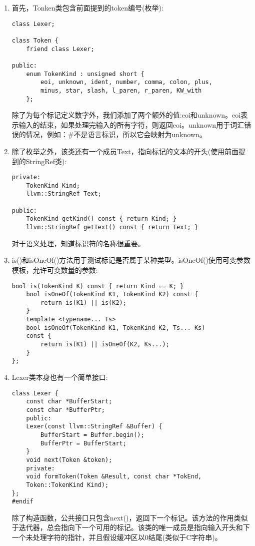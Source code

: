 \begin{enumerate}
\item 首先，Tonken类包含前面提到的token编号(枚举):
\begin{lstlisting}[caption={}]
class Lexer;

class Token {
	friend class Lexer;
	
public:
	enum TokenKind : unsigned short {
		eoi, unknown, ident, number, comma, colon, plus,
		minus, star, slash, l_paren, r_paren, KW_with
	};
\end{lstlisting}
除了为每个标记定义数字外，我们添加了两个额外的值:eoi和unknown。eoi表示输入的结束，如果处理完输入的所有字符，则返回eoi。unknown用于词汇错误的情况，例如：\#不是语言标识，所以它会映射为unknown。 
	
\item 除了枚举之外，该类还有一个成员Text，指向标记的文本的开头(使用前面提到的StringRef类):
\begin{lstlisting}[caption={}]
private:
	TokenKind Kind;
	llvm::StringRef Text;

public:
	TokenKind getKind() const { return Kind; }
	llvm::StringRef getText() const { return Text; }
\end{lstlisting}
对于语义处理，知道标识符的名称很重要。
	
\item is()和isOneOf()方法用于测试标记是否属于某种类型。isOneOf()使用可变参数模板，允许可变数量的参数:
\begin{lstlisting}[caption={}]
	bool is(TokenKind K) const { return Kind == K; }
	bool isOneOf(TokenKind K1, TokenKind K2) const {
		return is(K1) || is(K2);
	}
	template <typename... Ts>
	bool isOneOf(TokenKind K1, TokenKind K2, Ts... Ks)
	const {
		return is(K1) || isOneOf(K2, Ks...);
	}
};
\end{lstlisting}

\item Lexer类本身也有一个简单接口:
\begin{lstlisting}[caption={}]
class Lexer {
	const char *BufferStart;
	const char *BufferPtr;
	public:
	Lexer(const llvm::StringRef &Buffer) {
		BufferStart = Buffer.begin();
		BufferPtr = BufferStart;
	}
	void next(Token &token);
	private:
	void formToken(Token &Result, const char *TokEnd,
	Token::TokenKind Kind);
};
#endif
\end{lstlisting}
除了构造函数，公共接口只包含next()，返回下一个标记。该方法的作用类似于迭代器，总会指向下一个可用的标记。该类的唯一成员是指向输入开头和下一个未处理字符的指针，并且假设缓冲区以0结尾(类似于C字符串)。
	

\end{enumerate}
